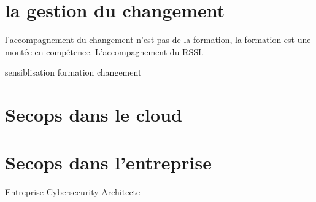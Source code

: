 \section{la gestion du changement}
l'accompagnement du changement n'est pas de la formation, la formation est une montée en compétence. 
L'accompagnement du RSSI.

sensiblisation
formation
changement

\section{Secops dans le cloud}
\section{Secops dans l'entreprise}

Entreprise Cybersecurity Architecte